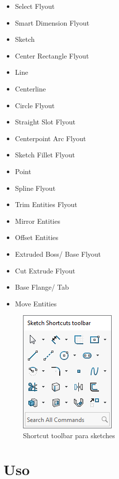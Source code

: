 \documentclass[12pt,letterpaper,final]{report}
\begin{document}
\begin{itemize}
	\item Select Flyout
	\item Smart Dimension Flyout
	\item Sketch
	\item Center Rectangle Flyout
	\item Line
	\item Centerline
	\item Circle Flyout
	\item Straight Slot Flyout
	\item Centerpoint Arc Flyout
	\item Sketch Fillet Flyout
	\item Point
	\item Spline Flyout
	\item Trim Entities Flyout
	\item Mirror Entities
	\item Offset Entities
	\item Extruded Boss/ Base Flyout
	\item Cut Extrude Flyout
	\item Base Flange/ Tab
	\item Move Entities
\end{itemize}

\begin{figure}[H]
	\centering
	\includegraphics[width=0.45\linewidth, height=0.5\textheight,keepaspectratio]{Imagenes/solidworks_shortcutbars_06}
	\caption{Shortcut toolbar para sketches}
	\label{fig:solidworksshortcutbars06}
\end{figure}


\section{Uso}
\end{document}
